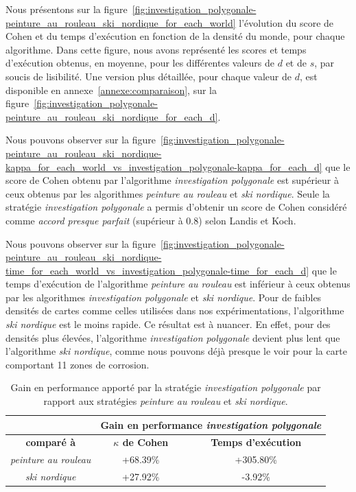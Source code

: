 \documentclass[francais,RandD]{rapportPFE}
\begin{document}
			Nous présentons sur la figure~\ref{fig:investigation_polygonale-peinture_au_rouleau_ski_nordique_for_each_world} l'évolution du score de Cohen et du temps d'exécution en fonction de la densité du monde, pour chaque algorithme.
			Dans cette figure, nous avons représenté les scores et temps d'exécution obtenus, en moyenne, pour les différentes valeurs de $d$ et de $s$, par soucis de lisibilité.
			Une version plus détaillée, pour chaque valeur de $d$, est disponible en annexe~\ref{annexe:comparaison}, sur la figure~\ref{fig:investigation_polygonale-peinture_au_rouleau_ski_nordique_for_each_d}.

			Nous pouvons observer sur la figure~\ref{fig:investigation_polygonale-peinture_au_rouleau_ski_nordique-kappa_for_each_world_vs_investigation_polygonale-kappa_for_each_d} que le score de Cohen obtenu par l'algorithme \textit{investigation polygonale} est supérieur à ceux obtenus par les algorithmes \textit{peinture au rouleau} et \textit{ski nordique}.
			Seule la stratégie \textit{investigation polygonale} a permis d'obtenir un score de Cohen considéré comme \textit{accord presque parfait} (supérieur à 0.8) selon Landis et Koch.

			Nous pouvons observer sur la figure~\ref{fig:investigation_polygonale-peinture_au_rouleau_ski_nordique-time_for_each_world_vs_investigation_polygonale-time_for_each_d} que le temps d'exécution de l'algorithme \textit{peinture au rouleau} est inférieur à ceux obtenus par les algorithmes \textit{investigation polygonale} et \textit{ski nordique}.
			Pour de faibles densités de cartes comme celles utilisées dans nos expérimentations, l'algorithme \textit{ski nordique} est le moins rapide.
			Ce résultat est à nuancer.
			En effet, pour des densités plus élevées, l'algorithme \textit{investigation polygonale} devient plus lent que l'algorithme \textit{ski nordique}, comme nous pouvons déjà presque le voir pour la carte comportant 11 zones de corrosion.

			\begin{table}[h!]
				\centering
				\begin{tabular}{|c|c|c|}
					\hline
					& \multicolumn{2}{c|}{\textbf{Gain en performance \textit{investigation polygonale}}} \\
					\hline
					\textbf{comparé à} & \textbf{$\kappa$ de Cohen} & \textbf{Temps d'exécution} \\
					\hline
					\textit{peinture au rouleau} & +68.39\% & +305.80\% \\
					\hline
					\textit{ski nordique} & +27.92\% & -3.92\% \\
					\hline
				\end{tabular}
				\caption{Gain en performance apporté par la stratégie \textit{investigation polygonale} par rapport aux stratégies \textit{peinture au rouleau} et \textit{ski nordique}.}
				\label{tab:gain}
			\end{table}
\end{document}
